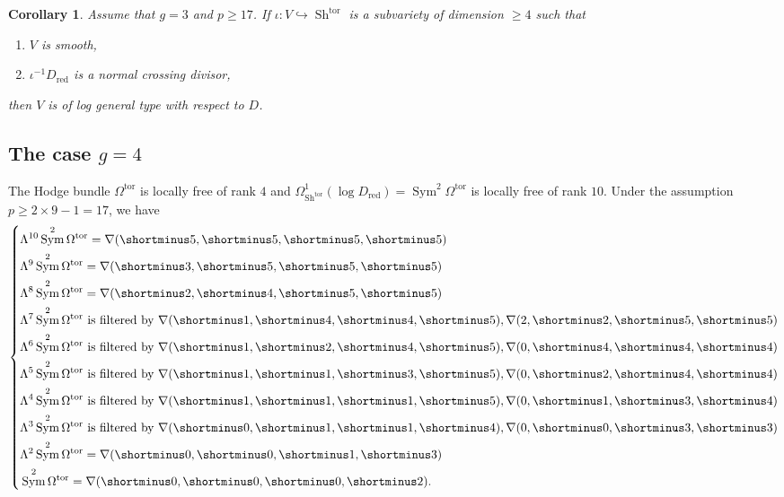 \documentclass[11pt]{amsart}
\numberwithin{subsection}{section}
\numberwithin{figure}{section}
\numberwithin{table}{section}
\theoremstyle{1}
\newtheorem{corollary}[theorem]{Corollary}
\theoremstyle{2}
\DeclareMathOperator{\Sh}{Sh}
\DeclareMathOperator{\Sym}{Sym}
\DeclareMathOperator{\tor}{tor}
\DeclareMathOperator{\red}{red}
\begin{document}
\begin{corollary}
Assume that $g = 3$ and $p \geq 17$. If $\iota : V \hookrightarrow \Sh^{\tor}$ is a subvariety of dimension $\geq 4$ such that
\begin{enumerate}
\item $V$ is smooth,
\item $\iota^{-1}D_{\red}$ is a normal crossing divisor,
\end{enumerate}
then $V$ is of log general type with respect to $D$.
\end{corollary}
\subsection{The case $g= 4$}
The Hodge bundle $\Omega^{\tor}$ is locally free of rank $4$ and $\Omega^1_{\Sh^{\tor}}(\log D_{\red}) = \Sym^2 \Omega^{\tor}$ is locally free of rank $10$. Under the assumption $p \geq 2 \times 9-1 = 17$, we have
\begin{equation*}
\left\{
\begin{aligned}
&\Lambda^{10}\Sym^2 \Omega^{\tor} = \nabla(\shortminus5,\shortminus5,\shortminus5,\shortminus 5) \\
&\Lambda^{9}\Sym^2 \Omega^{\tor} = \nabla(\shortminus 3,\shortminus5,\shortminus5,\shortminus 5) \\
&\Lambda^{8}\Sym^2 \Omega^{\tor} = \nabla(\shortminus2,\shortminus4,\shortminus5,\shortminus 5) \\
&\Lambda^{7}\Sym^2 \Omega^{\tor} \text{ is filtered by } \nabla(\shortminus1,\shortminus4,\shortminus4, \shortminus 5), \nabla(2,\shortminus 2,\shortminus 5, \shortminus 5) \\
&\Lambda^{6}\Sym^2 \Omega^{\tor}  \text{ is filtered by } \nabla(\shortminus1,\shortminus2,\shortminus4, \shortminus 5), \nabla(0,\shortminus 4,\shortminus 4, \shortminus 4) \\
&\Lambda^{5}\Sym^2 \Omega^{\tor}  \text{ is filtered by } \nabla(\shortminus1,\shortminus1,\shortminus3, \shortminus 5), \nabla(0,\shortminus 2,\shortminus 4, \shortminus 4) \\
&\Lambda^{4}\Sym^2 \Omega^{\tor}  \text{ is filtered by } \nabla(\shortminus1,\shortminus1,\shortminus1, \shortminus 5), \nabla(0,\shortminus 1,\shortminus 3, \shortminus 4) \\
&\Lambda^{3}\Sym^2 \Omega^{\tor}  \text{ is filtered by } \nabla(\shortminus0,\shortminus 1,\shortminus 1, \shortminus 4), \nabla(0,\shortminus 0,\shortminus 3, \shortminus 3) \\
&\Lambda^{2}\Sym^2 \Omega^{\tor} = \nabla(\shortminus0,\shortminus 0,\shortminus1, \shortminus 3) \\
&\Sym^2 \Omega^{\tor}  =  \nabla(\shortminus0,\shortminus 0,\shortminus0, \shortminus 2).
\end{aligned}
\right.
\end{equation*}
\end{document}
